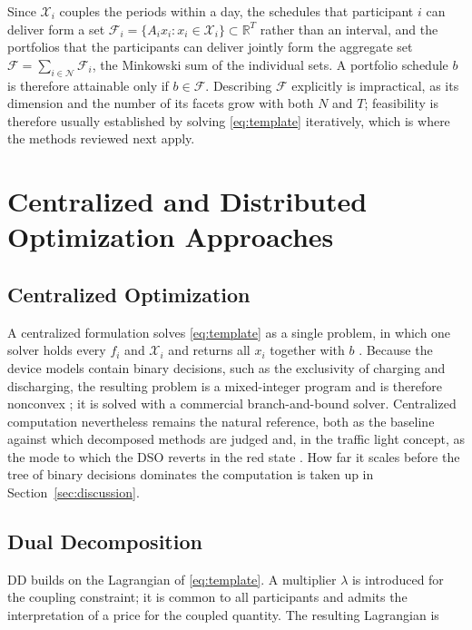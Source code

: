 \documentclass[conference]{IEEEtran}
\begin{document}
Since $\mathcal{X}_i$ couples the periods within a day, the schedules that participant $i$ can deliver form a set $\mathcal{F}_i = \{A_i x_i : x_i \in \mathcal{X}_i\} \subset \mathbb{R}^{T}$ rather than an interval, and the portfolios that the participants can deliver jointly form the aggregate set $\mathcal{F} = \sum_{i \in \mathcal{N}} \mathcal{F}_i$, the Minkowski sum of the individual sets. A portfolio schedule $b$ is therefore attainable only if $b \in \mathcal{F}$. Describing $\mathcal{F}$ explicitly is impractical, as its dimension and the number of its facets grow with both $N$ and $T$; feasibility is therefore usually established by solving \eqref{eq:template} iteratively, which is where the methods reviewed next apply.


\section{Centralized and Distributed Optimization Approaches}


\subsection{Centralized Optimization}

A centralized formulation solves \eqref{eq:template} as a single problem, in which one solver holds every $f_i$ and $\mathcal{X}_i$ and returns all $x_i$ together with $b$ \cite{Molzahn2017}. Because the device models contain binary decisions, such as the exclusivity of charging and discharging, the resulting problem is a mixed-integer program and is therefore nonconvex \cite{OlivellaRosell2020}; it is solved with a commercial branch-and-bound solver. Centralized computation nevertheless remains the natural reference, both as the baseline against which decomposed methods are judged and, in the traffic light concept, as the mode to which the DSO reverts in the red state \cite{Diekerhof2018}. How far it scales before the tree of binary decisions dominates the computation is taken up in Section~\ref{sec:discussion}.

\subsection{Dual Decomposition}

DD builds on the Lagrangian of \eqref{eq:template}. A multiplier $\lambda$ is introduced for the coupling constraint; it is common to all participants and admits the interpretation of a price for the coupled quantity. The resulting Lagrangian is
\end{document}
